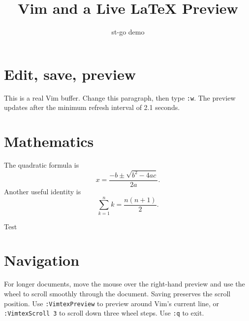 \documentclass{article}
\title{Vim and a Live LaTeX Preview}
\author{st-go demo}
\begin{document}
\maketitle

\section{Edit, save, preview}
This is a real Vim buffer. Change this paragraph, then type \texttt{:w}.
The preview updates after the minimum refresh interval of 2.1 seconds.

\section{Mathematics}
The quadratic formula is
\[
x = \frac{-b \pm \sqrt{b^2 - 4ac}}{2a}.
\]
Another useful identity is
\[
\sum_{k=1}^{n} k = \frac{n(n+1)}{2}.
\]

Test

\section{Navigation}
For longer documents, move the mouse over the right-hand preview and use the
wheel to scroll smoothly through the document. Saving preserves the scroll position.
Use \texttt{:VimtexPreview} to preview around Vim's current line, or
\texttt{:VimtexScroll 3} to scroll down three wheel steps. Use \texttt{:q} to exit.
\end{document}
